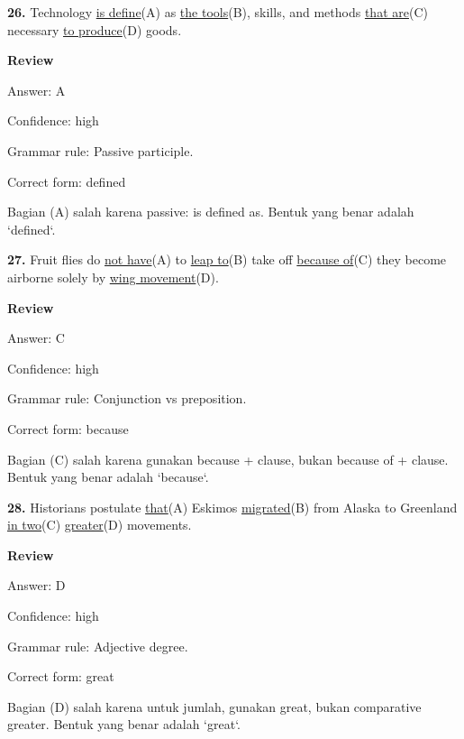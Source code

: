\documentclass[12pt]{article}
\begin{document}
\vspace{\questionblockgap}
\noindent\textbf{26.} Technology \uline{is define}(A) as \uline{the tools}(B), skills, and methods \uline{that are}(C) necessary \uline{to produce}(D) goods.
\par
\begingroup
\setlength{\parskip}{0pt}
\setlength{\parindent}{0pt}
\textbf{Review}\par
Answer: A\par
Confidence: high\par
Grammar rule: Passive participle.\par
Correct form: defined\par
Bagian (A) salah karena passive: is defined as. Bentuk yang benar adalah `defined`.\par
\endgroup
\par
\vspace{\questionblockgap}
\noindent\textbf{27.} Fruit flies do \uline{not have}(A) to \uline{leap to}(B) take off \uline{because of}(C) they become airborne solely by \uline{wing movement}(D).
\par
\begingroup
\setlength{\parskip}{0pt}
\setlength{\parindent}{0pt}
\textbf{Review}\par
Answer: C\par
Confidence: high\par
Grammar rule: Conjunction vs preposition.\par
Correct form: because\par
Bagian (C) salah karena gunakan because + clause, bukan because of + clause. Bentuk yang benar adalah `because`.\par
\endgroup
\par
\vspace{\questionblockgap}
\noindent\textbf{28.} Historians postulate \uline{that}(A) Eskimos \uline{migrated}(B) from Alaska to Greenland \uline{in two}(C) \uline{greater}(D) movements.
\par
\begingroup
\setlength{\parskip}{0pt}
\setlength{\parindent}{0pt}
\textbf{Review}\par
Answer: D\par
Confidence: high\par
Grammar rule: Adjective degree.\par
Correct form: great\par
Bagian (D) salah karena untuk jumlah, gunakan great, bukan comparative greater. Bentuk yang benar adalah `great`.\par
\endgroup
\par
\vspace{\questionblockgap}
\end{document}
